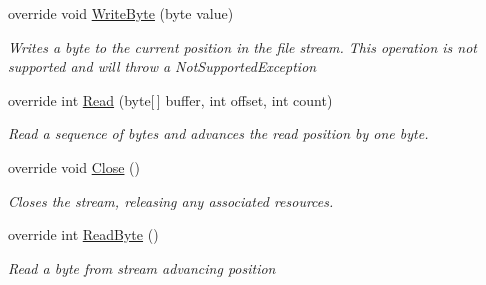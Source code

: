 \begin{DoxyCompactItemize}
override void \hyperlink{class_i_c_sharp_code_1_1_sharp_zip_lib_1_1_b_zip2_1_1_b_zip2_input_stream_a4edf7ef0d97ade56cf3e3152c2dc7965}{Write\+Byte} (byte value)
\begin{DoxyCompactList}\small\item\em Writes a byte to the current position in the file stream. This operation is not supported and will throw a Not\+Supported\+Exception \end{DoxyCompactList}\item 
override int \hyperlink{class_i_c_sharp_code_1_1_sharp_zip_lib_1_1_b_zip2_1_1_b_zip2_input_stream_a12c4aac76e23db7b6f1c374388dcab2c}{Read} (byte\mbox{[}$\,$\mbox{]} buffer, int offset, int count)
\begin{DoxyCompactList}\small\item\em Read a sequence of bytes and advances the read position by one byte. \end{DoxyCompactList}\item 
override void \hyperlink{class_i_c_sharp_code_1_1_sharp_zip_lib_1_1_b_zip2_1_1_b_zip2_input_stream_a6f1fff887e482b4f72fac6295b456f02}{Close} ()
\begin{DoxyCompactList}\small\item\em Closes the stream, releasing any associated resources. \end{DoxyCompactList}\item 
override int \hyperlink{class_i_c_sharp_code_1_1_sharp_zip_lib_1_1_b_zip2_1_1_b_zip2_input_stream_a642cf9f0bc3d282b4d8d21c1566137ac}{Read\+Byte} ()
\begin{DoxyCompactList}\small\item\em Read a byte from stream advancing position \end{DoxyCompactList}\end{DoxyCompactItemize}
